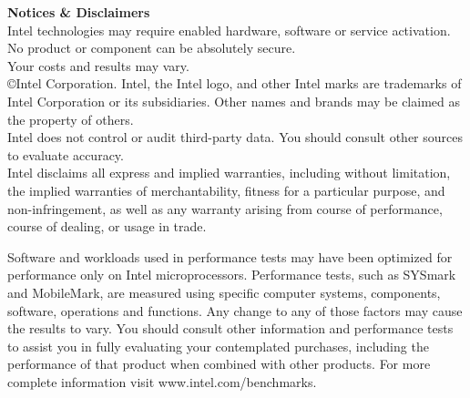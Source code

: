 \begin{framed}
\scriptsize

\noindent \textbf{Notices \& Disclaimers}
\\

\noindent Intel technologies may require enabled hardware, software or service activation.
\\

\noindent No product or component can be absolutely secure.
\\

\noindent Your costs and results may vary.
\\

\noindent \copyright Intel Corporation.  Intel, the Intel logo, and other Intel marks are trademarks of Intel Corporation or its subsidiaries.  Other names and brands may be claimed as the property of others.
\\

\noindent Intel does not control or audit third-party data.  You should consult other sources to evaluate accuracy.
\\

\noindent Intel disclaims all express and implied warranties, including without limitation, the implied warranties of merchantability, fitness for a particular purpose, and non-infringement, as well as any warranty arising from course of performance, course of dealing, or usage in trade.





\noindent Software and workloads used in performance tests may have been optimized for performance only on Intel microprocessors.  Performance tests, such as SYSmark and MobileMark, are measured using specific computer systems, components, software, operations and functions.  Any change to any of those factors may cause the results to vary.  You should consult other information and performance tests to assist you in fully evaluating your contemplated purchases, including the performance of that product when combined with other products.   For more complete information visit www.intel.com/benchmarks.
\\


\end{framed}
